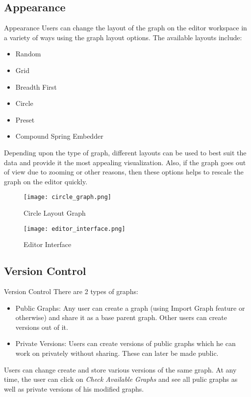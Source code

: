 \documentclass{beamer}
\begin{document}
\subsection{Appearance}
\begin{frame}{Appearance}
Users can change the layout of the graph on the editor workspace in a variety of ways using the graph layout options. The available layouts include:
\begin{itemize}
\item Random
\item Grid
\item Breadth First
\item Circle
\item Preset
\item Compound Spring Embedder
\end{itemize}
Depending upon the type of graph, different layouts can be used to best suit the data and provide it the most appealing visualization.
Also, if the graph goes out of view due to zooming or other reasons, then these options helps to rescale the graph on the editor quickly.
\end{frame}

\begin{frame}
\begin{figure}
\centering
\texttt{[image: circle\_graph.png]}
\label{fig:circle_graph}
\caption{Circle Layout Graph}
\end{figure}
\end{frame}

\begin{frame}
\begin{figure}
\centering
\texttt{[image: editor\_interface.png]}
\label{fig:editor_interface}
\caption{Editor Interface}
\end{figure}
\end{frame}

\subsection{Version Control}
\begin{frame}{Version Control}
There are 2 types of graphs:
\begin{itemize}
\item Public Graphs: Any user can create a graph (using Import Graph feature or otherwise) and share it as a base parent graph. Other users can create versions out of it.
\item Private Versions: Users can create versions of public graphs which he can work on privately without sharing. These can later be made public.
\end{itemize}
Users can change create and store various versions of the same graph. At any time, the user can click on \emph{Check Available Graphs} and see all pulic graphs as well as private versions of his modified graphs.
\end{frame}
\end{document}
